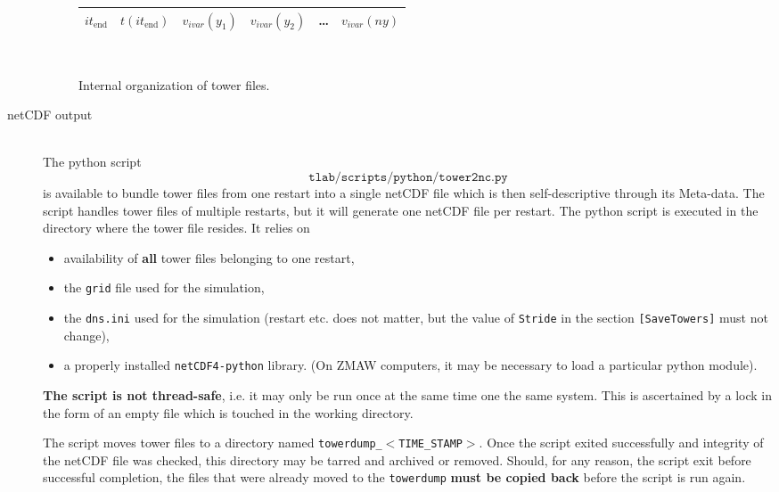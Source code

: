 \begin{description}
\begin{figure}
\begin{centering}
\begin{tabular}{| l | l | c | c | c | c | }
        $it_\mathrm{end}$   & $t(it_\mathrm{end})$ & $v_{ivar}(y_1)$ & $v_{ivar}(y_2)$ & \ldots & $v_{ivar}(ny)$ \\ 
        \hline
      \end{tabular}\\
    \end{centering}
  \caption{Internal organization of tower files.}
   \end{figure}  
  \item[netCDF output]~ \\ 
    The python script \[\texttt{tlab/scripts/python/tower2nc.py}\] is available to bundle tower files from one restart into a single netCDF file which 
    is then self-descriptive through its Meta-data. The script handles tower files of multiple restarts, but it will generate one netCDF file per restart.  
    The python script is executed in the directory where the tower file resides. 
    It relies on 
    \begin{itemize}  
      \item availability of \textbf{all} tower files belonging to one restart, 
      \item the \texttt{grid} file used for the simulation,
      \item the \texttt{dns.ini} used for the simulation (restart etc. does not matter, but the value of \texttt{Stride} 
        in the section \texttt{[SaveTowers]} must not change),
      \item a properly installed \texttt{netCDF4-python} library. (On ZMAW computers, it may be necessary to load a particular 
        python module).  
        
    \end{itemize} 
    \textbf{The script is not thread-safe}, i.e. it may only be run once at the same time 
    one the same system. This is ascertained by a lock in the form of an empty file which is touched 
    in the working directory. 
    \par 
    The script moves tower files to a directory named \texttt{towerdump\_}$<$\texttt{TIME\_STAMP}$>$. Once the script 
    exited successfully and integrity of the netCDF file was checked, this directory may be tarred and archived or removed. 
    Should, for any reason, the script exit before successful completion, the files that were already moved to the \texttt{towerdump} 
    \textbf{must be copied back} before the script is run again. 
\end{description}

